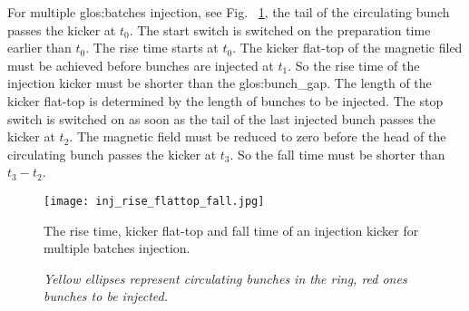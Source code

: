For multiple \gls{glos:batch}es injection, see Fig. ~\ref{inj_rise_flattop_fall}, the tail of the circulating bunch passes the kicker at $t_0$. The start switch is switched on the preparation time earlier than $t_0$. The rise time starts at $t_0$.  The kicker flat-top of the magnetic filed must be achieved before bunches are injected at $t_1$. So the rise time of the injection kicker must be shorter than the \gls{glos:bunch_gap}. The length of the kicker flat-top is determined by the length of bunches to be injected. The stop switch is switched on as soon as the tail of the last injected bunch passes the kicker at $t_2$. The magnetic field must be reduced to zero before the head of the circulating bunch passes the kicker at $t_3$. So the fall time must be shorter than $t_3-t_2$.

\begin{figure}[!htb]
   \centering   
   \texttt{[image: inj\_rise\_flattop\_fall.jpg]}
   \caption{The rise time, kicker flat-top and fall time of an injection kicker for multiple batches injection.}
	\caption*{\textsl{\small{Yellow ellipses represent circulating bunches in the ring, red ones bunches to be injected.}}}
   \label{inj_rise_flattop_fall}
\end{figure}

%


%
%


